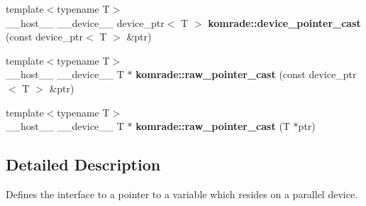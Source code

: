 \begin{CompactItemize}
{\footnotesize template$<$typename T$>$ }\\\_\-\_\-host\_\-\_\- \_\-\_\-device\_\-\_\- device\_\-ptr$<$ T $>$ {\bf komrade::device\_\-pointer\_\-cast} (const device\_\-ptr$<$ T $>$ \&ptr)
\item 
{\footnotesize template$<$typename T$>$ }\\\_\-\_\-host\_\-\_\- \_\-\_\-device\_\-\_\- T $\ast$ {\bf komrade::raw\_\-pointer\_\-cast} (const device\_\-ptr$<$ T $>$ \&ptr)
\item 
{\footnotesize template$<$typename T$>$ }\\\_\-\_\-host\_\-\_\- \_\-\_\-device\_\-\_\- T $\ast$ {\bf komrade::raw\_\-pointer\_\-cast} (T $\ast$ptr)
\end{CompactItemize}


\subsection{Detailed Description}
Defines the interface to a pointer to a variable which resides on a parallel device. 

